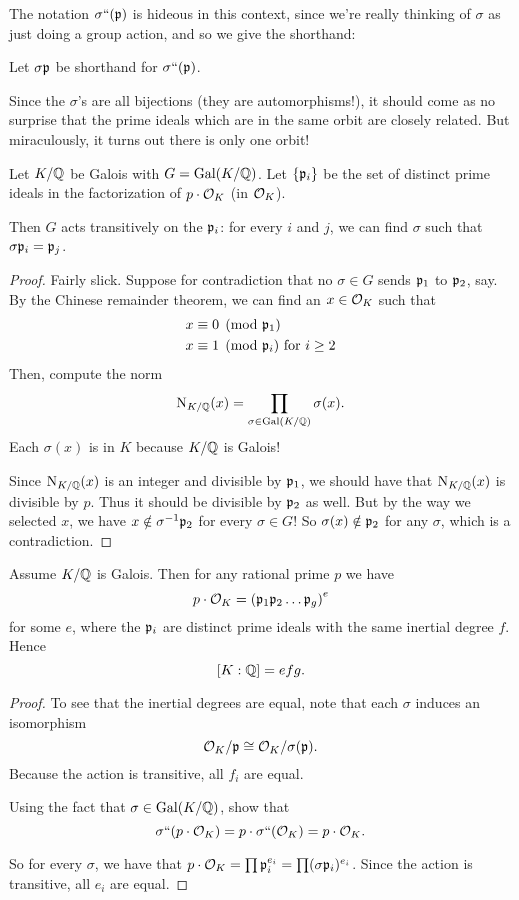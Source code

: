 The notation $\sigma``(\mathfrak p)$ is hideous in this context,
since we're really thinking of $\sigma$ as just doing a group action,
and so we give the shorthand:
\begin{abuse}
	Let $\sigma\mathfrak p$ be shorthand for $\sigma``(\mathfrak p)$.
\end{abuse}

Since the $\sigma$'s are all bijections (they are automorphisms!),
it should come as no surprise that the prime ideals which are in the same
orbit are closely related.
But miraculously, it turns out there is only one orbit!
\begin{theorem}
	Let $K/\mathbb Q$ be Galois with $G = \operatorname{Gal}(K/\mathbb Q)$.
	Let $\{\mathfrak p_i\}$ be the set of distinct prime ideals in
	the factorization of $p \cdot \mathcal O_K$ (in $\mathcal O_K$).

	Then $G$ acts transitively on the $\mathfrak p_i$:
	for every $i$ and $j$, we can find $\sigma$ such that $\sigma\mathfrak p_i = \mathfrak p_j$.
\end{theorem}
\begin{proof}
	Fairly slick.
	Suppose for contradiction that no $\sigma \in G$ sends $\mathfrak p_1$ to $\mathfrak p_2$, say.
	By the Chinese remainder theorem, we can find an $x \in \mathcal O_K$ such that
	\begin{align*}
		x &\equiv 0 \pmod{\mathfrak p_1} \\
		x &\equiv 1 \pmod{\mathfrak p_i} \text{ for $i \ge 2$}
	\end{align*}
	Then, compute the norm
	\[ \operatorname{N}_{K/\mathbb Q}(x) = \prod_{\sigma \in \operatorname{Gal}(K/\mathbb Q)} \sigma(x). \]
	Each $\sigma(x)$ is in $K$ because $K/\mathbb Q$ is Galois!

	Since $\operatorname{N}_{K/\mathbb Q}(x)$ is an integer and divisible by $\mathfrak p_1$,
	we should have that $\operatorname{N}_{K/\mathbb Q}(x)$ is divisible by $p$.
	Thus it should be divisible by $\mathfrak p_2$ as well.
	But by the way we selected $x$, we have $x \notin \sigma^{-1}\mathfrak p_2$ for every $\sigma \in G$!
	So $\sigma(x) \notin \mathfrak p_2$ for any $\sigma$, which is a contradiction.
\end{proof}
\begin{theorem}
	Assume $K/\mathbb Q$ is Galois.
	Then for any rational prime $p$ we have
	\[ p \cdot \mathcal O_K = \left( \mathfrak p_1 \mathfrak p_2 \dots \mathfrak p_g \right)^e \]
	for some $e$, where the $\mathfrak p_i$ are distinct prime ideals
	with the same inertial degree $f$.
	Hence \[ [K:\mathbb Q] = efg. \]
\end{theorem}
\begin{proof}
	To see that the inertial degrees are equal, note that each $\sigma$
	induces an isomorphism
	\[ \mathcal O_K / \mathfrak p \cong \mathcal O_K / \sigma(\mathfrak p). \]
	Because the action is transitive, all $f_i$ are equal.
	\begin{exercise}
		Using the fact that $\sigma \in \operatorname{Gal}(K/\mathbb Q)$,
		show that \[ \sigma``(p \cdot \mathcal O_K) = p \cdot \sigma``(\mathcal O_K) = p \cdot \mathcal O_K. \]
	\end{exercise}
	So for every $\sigma$, we have that
	$p \cdot \mathcal O_K = \prod \mathfrak p_i^{e_i} = \prod (\sigma\mathfrak p_i)^{e_i}$.
	Since the action is transitive, all $e_i$ are equal.
\end{proof}

